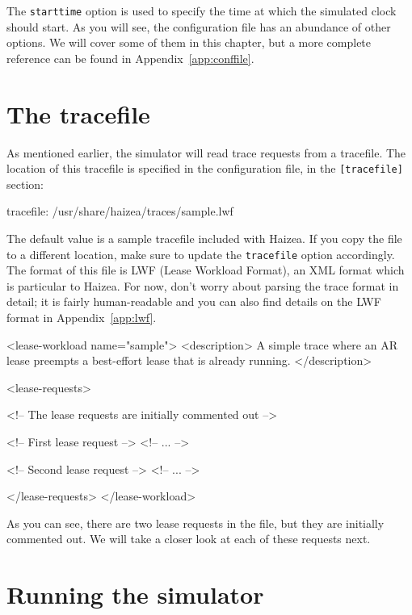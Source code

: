 The \texttt{starttime} option is used to specify the time at which the simulated clock should start. As you will see, the configuration file has an abundance of other options. We will cover some of them in this chapter, but a more complete reference can be found in Appendix~\ref{app:conffile}.

\section{The tracefile}

As mentioned earlier, the simulator will read trace requests from a tracefile. The location of this tracefile is specified in the configuration file, in the \texttt{[tracefile]} section:

\begin{wideshellverbatim}
[tracefile]
tracefile: /usr/share/haizea/traces/sample.lwf 
\end{wideshellverbatim}

The default value is a sample tracefile included with Haizea. If you copy the file to a different location, make sure to update the \texttt{tracefile} option accordingly. The format of this file is LWF (Lease Workload Format), an XML format which is particular to Haizea. For now, don't worry about parsing the trace format in detail; it is fairly human-readable and you can also find details on the LWF format in Appendix~\ref{app:lwf}.

\begin{wideshellverbatim}
<lease-workload name="sample">
	<description>
	A simple trace where an AR lease preempts a 
	best-effort lease that is already running. 
	</description>

	<lease-requests>
	
	<!-- The lease requests are initially commented out -->
	
	<!-- First lease request -->
	<!--
	...
	-->

	<!-- Second lease request -->
	<!--
	...
	-->
	
	</lease-requests>
</lease-workload>
\end{wideshellverbatim}

As you can see, there are two lease requests in the file, but they are initially commented out. We will take a closer look at each of these requests next.

\section{Running the simulator}

